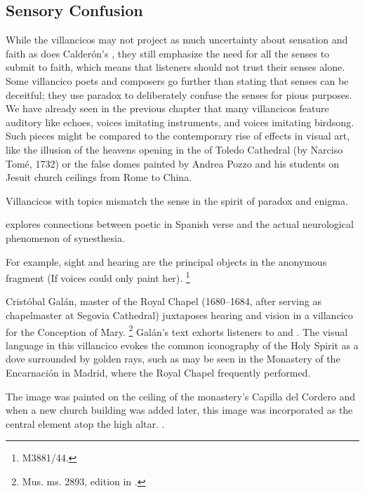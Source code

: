 \subsection{Sensory Confusion}

While the  villancicos may not project as much 
uncertainty about sensation and faith as does Calderón's , they still emphasize the need for all the senses to submit 
to faith, which means that listeners should not trust their senses alone.
Some villancico poets and composers go further than stating that senses can be 
deceitful; they use paradox to deliberately confuse the senses for pious 
purposes.
We have already seen in the previous chapter that many villancicos feature 
auditory  like echoes, voices imitating instruments, 
and voices imitating birdsong.
Such pieces might be compared to the contemporary rise of  
effects in visual art, like the illusion of the heavens opening in the 
 of Toledo Cathedral (by Narciso Tomé, 1732) or the false 
domes painted by Andrea Pozzo and his students on Jesuit church ceilings from 
Rome to China.%
    \Autocites[]{GroveArt}[110]{Bailey:Art}

Villancicos with  topics mismatch the sense in the spirit 
of paradox and enigma.%
\begin{Footnote}
    \Autocite{DoetschKraus:Sinestesia} explores connections between poetic 
     in Spanish verse and the actual neurological 
    phenomenon of synesthesia.
\end{Footnote}
For example, sight and hearing are the principal objects in the anonymous 
fragment  (If voices could 
only paint her).%
\footnote{\signature{E-Mn}{M3881/44}.}

Cristóbal Galán, master of the Royal Chapel (1680--1684, after serving as 
chapelmaster at Segovia Cathedral) juxtaposes hearing and vision in a 
villancico for the Conception of Mary.%
    \footnote{\signature{D-Mbs}{Mus. ms. 2893}, edition in 
\autocite[567--568]{CaberoPueyo:PhD}.}
Galán's text exhorts listeners to  and .
The visual language in this villancico evokes the common iconography of the 
Holy Spirit as a dove surrounded by golden rays, such as may be seen in the 
Monastery of the Encarnación in Madrid, where the Royal Chapel frequently 
performed.%
\begin{Footnote}
    The image was painted on the ceiling of the monastery's Capilla del Cordero 
    and when a new church building was added later, this image was incorporated as 
    the central element atop the high altar.
    \Autocite[69--70, 81]{Sanz:GuiaDescalzasEncarnacion}.
\end{Footnote}

